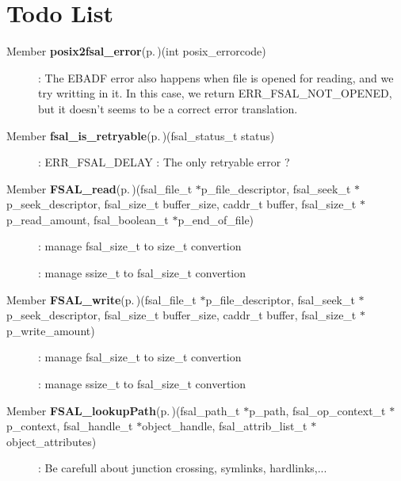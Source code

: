 \section{Todo List}\label{todo}
\label{todo__todo000001}
 \begin{description}
\item[Member {\bf posix2fsal\_\-error}{\rm (p.\,\pageref{fsal__convert_8c_a2})}(int posix\_\-errorcode) ]: The EBADF error also happens when file is opened for reading, and we try writting in it. In this case, we return ERR\_\-FSAL\_\-NOT\_\-OPENED, but it doesn't seems to be a correct error translation. \end{description}


\label{todo__todo000002}
 \begin{description}
\item[Member {\bf fsal\_\-is\_\-retryable}{\rm (p.\,\pageref{fsal__errors_8c_a0})}(fsal\_\-status\_\-t status) ]: ERR\_\-FSAL\_\-DELAY : The only retryable error ?\end{description}


\label{todo__todo000003}
 \begin{description}
\item[Member {\bf FSAL\_\-read}{\rm (p.\,\pageref{fsal__fileop_8c_a2})}(fsal\_\-file\_\-t $\ast$p\_\-file\_\-descriptor, fsal\_\-seek\_\-t $\ast$p\_\-seek\_\-descriptor, fsal\_\-size\_\-t buffer\_\-size, caddr\_\-t buffer, fsal\_\-size\_\-t $\ast$p\_\-read\_\-amount, fsal\_\-boolean\_\-t $\ast$p\_\-end\_\-of\_\-file) ]: manage fsal\_\-size\_\-t to size\_\-t convertion 

: manage ssize\_\-t to fsal\_\-size\_\-t convertion\end{description}


\label{todo__todo000004}
 \begin{description}
\item[Member {\bf FSAL\_\-write}{\rm (p.\,\pageref{fsal__fileop_8c_a3})}(fsal\_\-file\_\-t $\ast$p\_\-file\_\-descriptor, fsal\_\-seek\_\-t $\ast$p\_\-seek\_\-descriptor, fsal\_\-size\_\-t buffer\_\-size, caddr\_\-t buffer, fsal\_\-size\_\-t $\ast$p\_\-write\_\-amount) ]: manage fsal\_\-size\_\-t to size\_\-t convertion 

: manage ssize\_\-t to fsal\_\-size\_\-t convertion\end{description}


\label{todo__todo000005}
 \begin{description}
\item[Member {\bf FSAL\_\-lookup\-Path}{\rm (p.\,\pageref{fsal__lookup_8c_a1})}(fsal\_\-path\_\-t $\ast$p\_\-path, fsal\_\-op\_\-context\_\-t $\ast$p\_\-context, fsal\_\-handle\_\-t $\ast$object\_\-handle, fsal\_\-attrib\_\-list\_\-t $\ast$object\_\-attributes) ]: Be carefull about junction crossing, symlinks, hardlinks,...\end{description}
